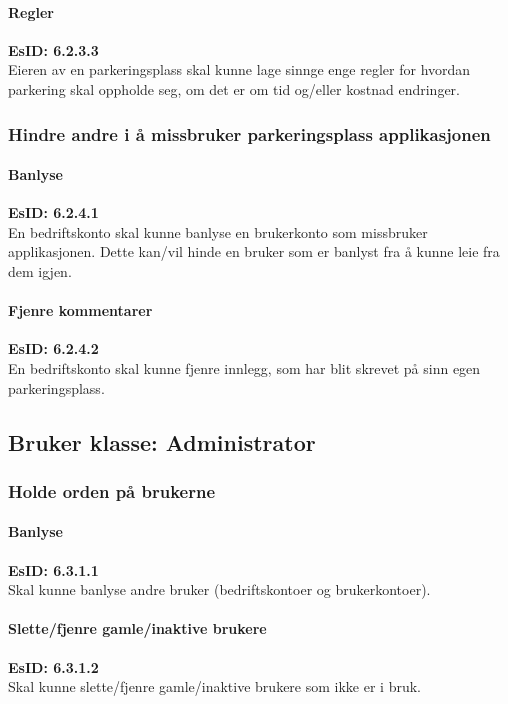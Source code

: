 \documentclass[12pt]{article}
\begin{document}
            \paragraph{Regler}
            \textbf{EsID: 6.2.3.3}\\Eieren av en parkeringsplass skal kunne lage sinnge enge regler for hvordan parkering skal oppholde seg, om det er om tid og/eller kostnad endringer.
        
        \subsubsection{Hindre andre i å missbruker parkeringsplass applikasjonen}

            \paragraph{Banlyse}
            \textbf{EsID: 6.2.4.1}\\En bedriftskonto skal kunne banlyse en brukerkonto som missbruker applikasjonen. Dette kan/vil hinde en bruker som er banlyst fra å kunne leie fra dem igjen.

            \paragraph{Fjenre kommentarer}
            \textbf{EsID: 6.2.4.2}\\En bedriftskonto skal kunne fjenre innlegg, som har blit skrevet på sinn egen parkeringsplass.

    \subsection{Bruker klasse: Administrator}

        \subsubsection{Holde orden på brukerne}

            \paragraph{Banlyse}
            \textbf{EsID: 6.3.1.1}\\Skal kunne banlyse andre bruker (bedriftskontoer og brukerkontoer).

            \paragraph{Slette/fjenre gamle/inaktive brukere}
            \textbf{EsID: 6.3.1.2}\\Skal kunne slette/fjenre gamle/inaktive brukere som ikke er i bruk.
\end{document}
